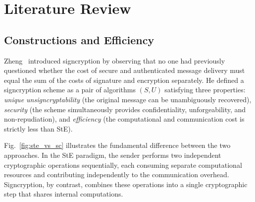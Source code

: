 \documentclass[conference]{IEEEtran}
\begin{document}
\section{Literature Review}

\subsection{Constructions and Efficiency}

Zheng~\cite{zheng1997} introduced signcryption by observing that no one had previously questioned whether the cost of secure and authenticated message delivery must equal the sum of the costs of signature and encryption separately. He defined a signcryption scheme as a pair of algorithms $(S, U)$ satisfying three properties: \textit{unique unsigncryptability} (the original message can be unambiguously recovered), \textit{security} (the scheme simultaneously provides confidentiality, unforgeability, and non-repudiation), and \textit{efficiency} (the computational and communication cost is strictly less than StE).

Fig.~\ref{fig:ste_vs_sc} illustrates the fundamental difference between the two approaches. In the StE paradigm, the sender performs two independent cryptographic operations sequentially, each consuming separate computational resources and contributing independently to the communication overhead. Signcryption, by contrast, combines these operations into a single cryptographic step that shares internal computations.
\end{document}
